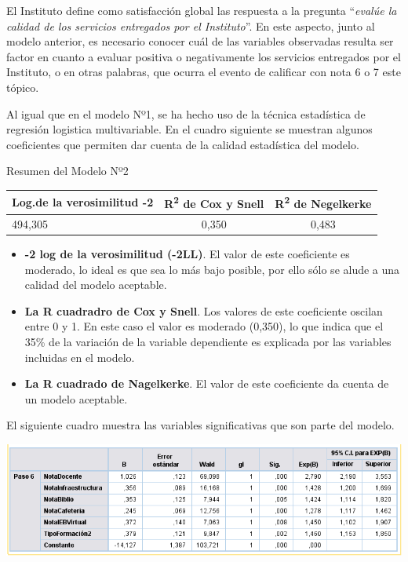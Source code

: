 \documentclass[]{book}
\begin{document}
El Instituto define como satisfacción global las respuesta a la pregunta
``\emph{evalúe la calidad de los servicios entregados por el
Instituto}''. En este aspecto, junto al modelo anterior, es necesario
conocer cuál de las variables observadas resulta ser factor en cuanto a
evaluar positiva o negativamente los servicios entregados por el
Instituto, o en otras palabras, que ocurra el evento de calificar con
nota 6 o 7 este tópico.

Al igual que en el modelo Nº1, se ha hecho uso de la técnica estadística
de regresión logistica multivariable. En el cuadro siguiente se muestran
algunos coeficientes que permiten dar cuenta de la calidad estadística
del modelo.

Resumen del Modelo Nº2

\begin{longtable}[]{@{}lcc@{}}
\toprule
Log.de la verosimilitud -2 & R\textsuperscript{2} de Cox y Snell &
R\textsuperscript{2} de Negelkerke\tabularnewline
\midrule
\endhead
494,305 & 0,350 & 0,483\tabularnewline
\bottomrule
\end{longtable}

\begin{itemize}
\item
  \textbf{-2 log de la verosimilitud (-2LL)}. El valor de este
  coeficiente es moderado, lo ideal es que sea lo más bajo posible, por
  ello sólo se alude a una calidad del modelo aceptable.
\item
  \textbf{La R cuadradro de Cox y Snell}. Los valores de este
  coeficiente oscilan entre 0 y 1. En este caso el valor es moderado
  (0,350), lo que indica que el 35\% de la variación de la variable
  dependiente es explicada por las variables incluidas en el modelo.
\item
  \textbf{La R cuadrado de Nagelkerke}. El valor de este coeficiente da
  cuenta de un modelo aceptable.
\end{itemize}

El siguiente cuadro muestra las variables significativas que son parte
del modelo.

\begin{center}\includegraphics{images/Modelo2} \end{center}
\end{document}
